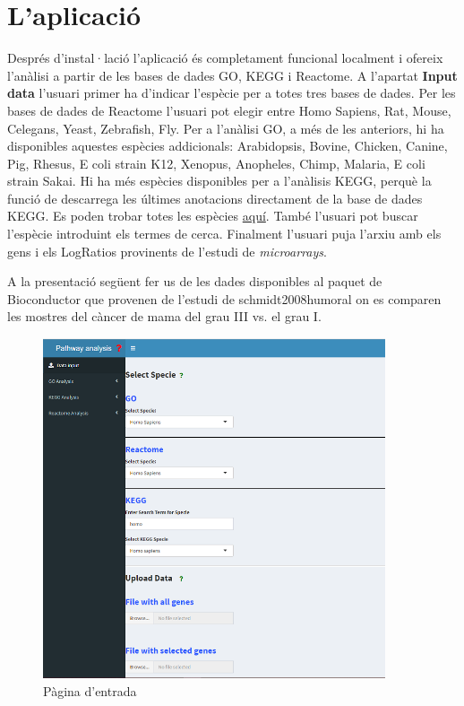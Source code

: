 \chapter{L'aplicació}

Després d'instal·lació l'aplicació és completament funcional localment i ofereix l'anàlisi a partir de les bases de dades GO, KEGG i Reactome. A l'apartat \textbf{Input data} l'usuari primer ha d'indicar l'espècie per a totes tres bases de dades. Per les bases de dades de Reactome l'usuari pot elegir entre Homo Sapiens, Rat, Mouse, Celegans, Yeast, Zebrafish, Fly. Per a l’anàlisi GO, a més de les anteriors, hi ha disponibles aquestes espècies addicionals: Arabidopsis, Bovine, Chicken, Canine, Pig, Rhesus, E coli strain K12, Xenopus, Anopheles, Chimp, Malaria, E coli strain Sakai. Hi ha més espècies disponibles per a l'anàlisis KEGG, perquè la funció de   descarrega les últimes anotacions directament de la base de dades KEGG. Es poden trobar totes les espècies \href{http://www.genome.jp/kegg/catalog/org_list.html}{aquí}. També l'usuari pot buscar l'espècie introduint els termes de cerca. Finalment l'usuari puja l'arxiu amb els gens i els LogRatios provinents de l'estudi de \textit{microarrays}. 

A la presentació següent fer us de les dades disponibles al paquet  de Bioconductor que provenen de l'estudi de schmidt2008humoral on es comparen les mostres del càncer de mama del grau III vs. el grau I. 


\begin{figure}[H]
\caption{Pàgina d'entrada}
\centering
\includegraphics[width=0.9\textwidth]{figures/App_F1.png}
\end{figure}


